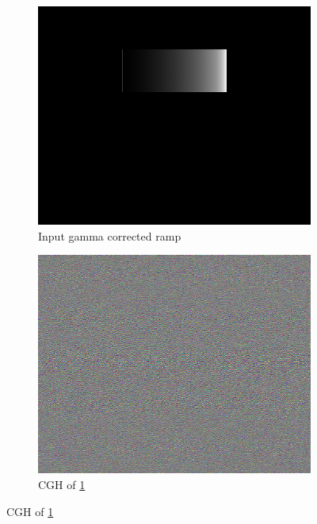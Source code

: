 \begin{figure}[H]
  \centering
  \begin{subfigure}[c]{0.32\textwidth}
    \includegraphics[width=\textwidth]{grey_scale_gamma_corrected.png}
    \caption{Input gamma corrected ramp}\label{fig:grey_scale_gamma_corrected}
  \end{subfigure}
  \hfill
  \begin{subfigure}[c]{0.32\textwidth}
    \includegraphics[width=\textwidth]{Holo_gamma_corrected_ramp.png}
    \caption{CGH of \cref{fig:grey_scale_gamma_corrected}}\label{fig:Holo_gamma_corrected_ramp}
  \end{subfigure}

\end{figure}
